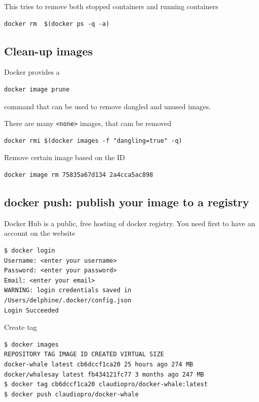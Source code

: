 This tries to remove both stopped containers and running containers

\begin{verbatim}
docker rm  $(docker ps -q -a)
\end{verbatim}



\subsection{Clean-up images}


Docker provides a 
\begin{verbatim}
docker image prune
\end{verbatim}
 command that can be used to remove dangled and unused images.

There are many \verb!<none>! images, that cam be removed

\begin{verbatim}
docker rmi $(docker images -f "dangling=true" -q)
\end{verbatim}

Remove certain image based on the ID
\begin{verbatim}
docker image rm 75835a67d134 2a4cca5ac898
\end{verbatim}


\subsection{docker push: publish your image to a registry}

Docker Hub is a public, free hosting of docker registry. 
You need first to have an account on the website

\begin{verbatim}
$ docker login
Username: <enter your username>
Password: <enter your password>
Email: <enter your email>
WARNING: login credentials saved in /Users/delphine/.docker/config.json
Login Succeeded

\end{verbatim}

Create tag
\begin{verbatim}
$ docker images
REPOSITORY TAG IMAGE ID CREATED VIRTUAL SIZE
docker-whale latest cb6dccf1ca20 25 hours ago 274 MB
docker/whalesay latest fb434121fc77 3 months ago 247 MB
$ docker tag cb6dccf1ca20 claudiopro/docker-whale:latest
$ docker push claudiopro/docker-whale

\end{verbatim}

